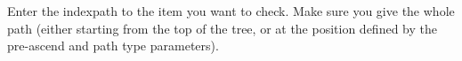 
 Enter the indexpath to the item you want to check. Make sure you give the whole path (either starting from the top of the tree, or at the position defined by the pre-ascend and path type parameters).



